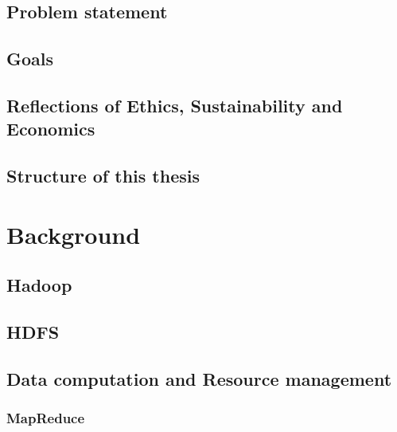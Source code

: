 \documentclass[12pt,a4paper,twoside,openright]{book}
\begin{document}
\section{Problem statement}
\label{sec:problem_statement}


\section{Goals}
\label{sec:goals_intro}


\section{Reflections of Ethics, Sustainability and Economics}
\label{sec:ethics_sust}


\section{Structure of this thesis}
\label{sec:thesis_structure}


\chapter{Background}
\label{chap:background}


\section{Hadoop}
\label{sec:hadoop}


\section{HDFS}
\label{sec:hdfs}


\section{Data computation and Resource management}
\label{sec:resource_mgm}


\subsection{MapReduce}
\label{ssec:mapreduce}

\end{document}
